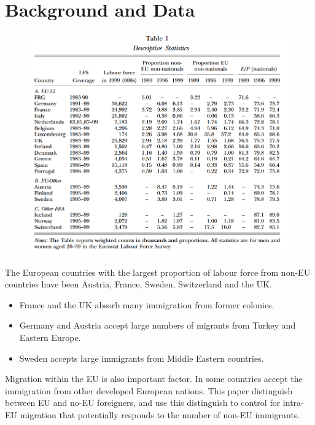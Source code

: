 \documentclass[../root]{subfiles}
\begin{document}
    \section{Background and Data}
    \begin{figure}[h]
        \includegraphics[width=15cm]{0529sugiyama/Table1.png}
    \end{figure}
    The European countries with the largest proportion of labour force from non-EU countries have been Austria, France, Sweden, Switzerland and the UK.
    \begin{itemize}
        \item France and the UK absorb many immigration from former colonies.
        \item Germany and Austria accept large numbers of migrants from Turkey and Eastern Europe.
        \item Sweden accepts large immigrants from Middle Eastern countries. 
    \end{itemize}
     
    Migration within the EU is also important factor. In some countries accept the immigration from other developed European nations. 
    This paper distinguish between EU and no-EU foreigners, and use this distinguish to control for intra-EU migration that potentially responds to the number of non-EU immigrants. 
\end{document}
